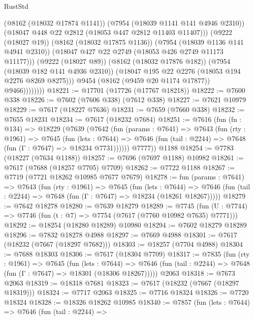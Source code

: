 \begin{lexlean}{RustStd}
\begin{coremodule}
                          (@8162 (@18032 @17874 @1141))
                          (@7954 (@18039 @1141 @141 @4946 @2310))
                          (@18047 @448 @22 @2812 (@18053 @447 @2812 @11403 @11407)))
                        (@9222 (@18027 @19))
                        (@8162 (@18032 @17875 @1136))
                        (@7954 (@18039 @1136 @141 @4941 @2310))
                        (@18047 @427 @22 @2749 (@18053 @426 @2749 @11173 @11177)))
                      (@9222 (@18027 @89))
                      (@8162 (@18032 @17876 @182))
                      (@7954 (@18039 @182 @141 @4936 @2310))
                      (@18047 @195 @22 @2276 (@18053 @194 @2276 @8269 @8275)))
                    @9454
                    (@8162 (@9459 @20 @1174 @17877))
                    @9466))))))))
@18221 := @17701 (@17726 (@17767 @18218))
@18222 := @7600 @338
@18226 := @7602 (@7606 @338) (@7612 @338)
@18227 := @7621 @10979
@18229 := @7617 (@18227 @7636)
@18231 := @7659 (@7660 @338)
@18232 := @7655 @18231
@18234 := @7617 (@18232 @7684)
@18251 := @7616
    (fun (fn : @134) =>
    @18229
      (@7639
        (@7642
          (fun (params : @7641) =>
          @7643
            (fun (rty : @1961) =>
            @7645
              (fun (lets : @7644) =>
              @7646 (fun (tail : @2244) => @7648 (fun (Γ : @7647) => @18234 @7731))))))
        @7777))
    @1188
@18254 := @7783 (@18227 (@7634 @1188))
@18257 := @7696 (@7697 @1188) @10982
@18261 := @7617 (@7688 (@18257 @7705) @7709)
@18262 := @7722 @1188
@18267 := @7719 (@7721 @18262 @10985 @7677 @7679)
@18278 := fun (params : @7641) =>
  @7643
    (fun (rty : @1961) =>
    @7645
      (fun (lets : @7644) =>
      @7646 (fun (tail : @2244) => @7648 (fun (Γ : @7647) => @18234 (@18261 @18267)))))
@18279 := @7642 @18278
@18280 := @7639 @18279
@18289 := @7745
    (fun (U : @7744) => @7746 (fun (t : @7) => @7754 (@7617 (@7760 @10982 @7635) @7771)))
@18292 := @18254 (@18280 @18289) @10980
@18294 := @7602 @18279 @18289
@18296 := @7832 @18278 @4988
@18297 := @7669 @4988
@18301 := @7617 (@18232 (@7667 (@18297 @7682)))
@18303 := @18257 (@7704 @4988)
@18304 := @7688 @18303
@18306 := @7617 (@18304 @7709)
@18317 := @7835
    (fun (rty : @1961) =>
    @7645
      (fun (lets : @7644) =>
      @7646 (fun (tail : @2244) => @7648 (fun (Γ : @7647) => @18301 (@18306 @18267)))))
    @2063
@18318 := @7673 @2063
@18319 := @18318 @7681
@18323 := @7617 (@18232 (@7667 (@18297 @18319)))
@18324 := @7717 @2063
@18325 := @7716 @18324
@18326 := @7720 @18324
@18328 := @18326 @18262 @10985
@18340 := @7857
    (fun (lets : @7644) =>
    @7646
      (fun (tail : @2244) =>

\end{coremodule}
\end{lexlean}
